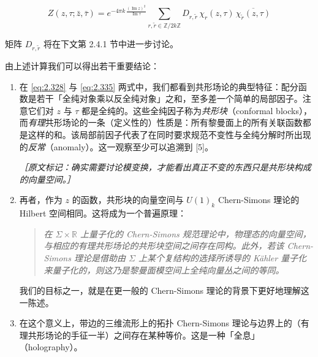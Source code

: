 
\begin{equation}
  Z(z,\tau;\bar z,\bar\tau)
  = e^{-4\pi k\,\frac{(\operatorname{Im}z)^2}{\operatorname{Im}\tau}}
  \sum_{r,\tilde r\in\mathbb{Z}/2k\mathbb{Z}}
  D_{r,\tilde r}\,\chi_r(z,\tau)\,\overline{\chi_{\tilde r}(z,\tau)}
  \tag{2.335}
  \label{eq:2.335}
\end{equation}

矩阵 $D_{r,\tilde r}$ 将在下文第 2.4.1 节中进一步讨论。

由上述计算我们可以得出若干重要结论：

\begin{enumerate}
  \item 在 \eqref{eq:2.328} 与 \eqref{eq:2.335} 两式中，我们都看到共形场论的典型特征：配分函数是若干「全纯对象乘以反全纯对象」之和，至多差一个简单的局部因子。注意它们对 $z$ 与 $\tau$ 都是全纯的。这些全纯因子称为\emph{共形块}（conformal blocks），而\emph{有理}共形场论的一条（定义性的）性质是：所有黎曼面上的所有关联函数都是这样的和。该局部前因子代表了在同时要求规范不变性与全纯分解时所出现的\emph{反常}（anomaly）。这一观察至少可以追溯到 [5]。

  {\small\itshape ［原文标记：确实需要讨论模变换，才能看出真正不变的东西只是共形块构成的向量空间。］}

  \item 再者，作为 $z$ 的函数，共形块的向量空间与 $U(1)_k$ Chern-Simons 理论的 Hilbert 空间相同。这将成为一个普遍原理：

  \begin{quote}
    \itshape
    在 $\Sigma\times\mathbb{R}$ 上量子化的 Chern-Simons 规范理论中，物理态的向量空间，与相应的有理共形场论的共形块空间之间存在同构。此外，若该 Chern-Simons 理论是借助由 $\Sigma$ 上某个复结构的选择所诱导的 Kähler 量子化来量子化的，则这乃是黎曼面模空间上全纯向量丛之间的等同。
  \end{quote}

  我们的目标之一，就是在更一般的 Chern-Simons 理论的背景下更好地理解这一陈述。

  \item 在这个意义上，带边的三维流形上的拓扑 Chern-Simons 理论与边界上的（有理共形场论的手征一半）之间存在某种等价。这是一种「全息」（holography）。
\end{enumerate}

